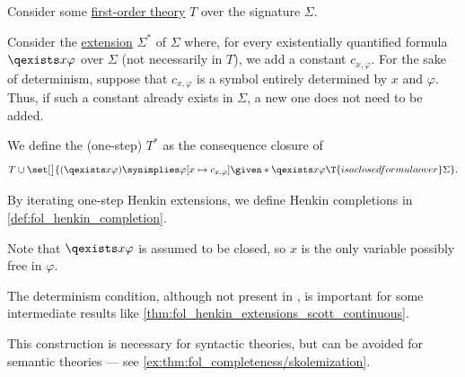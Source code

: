 \begin{definition}\label{def:fol_henkin_extension}
  Consider some \hyperref[def:fol_theory]{first-order theory} \( T \) over the signature \( \Sigma \).

  Consider the \hyperref[def:fol_signature_extension]{extension} \( \Sigma^* \) of \( \Sigma \) where, for every existentially quantified formula \( \qexists x \varphi \) over \( \Sigma \) (not necessarily in \( T \)), we add a constant \( c_{x,\varphi} \). For the sake of determinism, suppose that \( c_{x,\varphi} \) is a symbol entirely determined by \( x \) and \( \varphi \). Thus, if such a constant already exists in \( \Sigma \), a new one does not need to be added.

  We define the (one-step)  \( T^* \) as the consequence closure of
  \begin{equation}\label{eq:def:fol_henkin_extension}
    T \cup \set[\big]{ (\qexists x \varphi) \synimplies \varphi[x \mapsto c_{x,\varphi}] \given* \qexists x \varphi \T{is a closed formula over} \Sigma }.
  \end{equation}
\end{definition}
\begin{comments}
  \item By iterating one-step Henkin extensions, we define Henkin completions in \cref{def:fol_henkin_completion}.

  \item Note that \( \qexists x \varphi \) is assumed to be closed, so \( x \) is the only variable possibly free in \( \varphi \).

  \item The determinism condition, although not present in \cite[def. 3.1.6]{VanDalen2004LogicAndStructure}, is important for some intermediate results like \cref{thm:fol_henkin_extensions_scott_continuous}.

  \item This construction is necessary for syntactic theories, but can be avoided for semantic theories --- see \cref{ex:thm:fol_completeness/skolemization}.
\end{comments}

